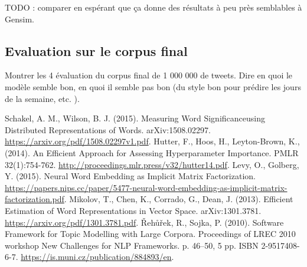 \documentclass[11pt,french,french]{article}
\begin{document}
\colorbox{BurntOrange}{TODO : comparer en espérant que ça 
 donne des résultats à peu près semblables à Gensim.}

\hypertarget{evaluation-sur-le-corpus-final}{%
\subsection{Evaluation sur le corpus
final}\label{evaluation-sur-le-corpus-final}}

\colorbox{BurntOrange}{Montrer les 4 évaluation du corpus final de 1 000 000 de tweets.
 Dire en quoi le modèle semble bon, en quoi il semble pas bon
 (du style bon pour prédire les jours de la semaine, etc. ). }

\nocite{*}

\begin{thebibliography}{999}
 Schakel, A. M., Wilson, B. J. (2015). Measuring Word Significanceusing Distributed Representations of Words. arXiv:1508.02297. \url{https://arxiv.org/pdf/1508.02297v1.pdf}.
 Hutter, F., Hoos, H., Leyton-Brown, K., (2014). An Efficient Approach for Assessing Hyperparameter Importance. PMLR 32(1):754-762. \url{http://proceedings.mlr.press/v32/hutter14.pdf}.
 Levy, O., Golberg, Y. (2015). Neural Word Embedding as Implicit Matrix Factorization.
\url{https://papers.nips.cc/paper/5477-neural-word-embedding-as-implicit-matrix-factorization.pdf}.
 Mikolov, T.,  Chen, K., Corrado, G., Dean, J. (2013). Efficient Estimation of Word Representations in Vector Space. arXiv:1301.3781. \url{https://arxiv.org/pdf/1301.3781.pdf}.
 {\v R}eh{\r u}{\v r}ek, R.,  Sojka, P. (2010). Software Framework for Topic Modelling with Large Corpora. Proceedings of LREC 2010 workshop New Challenges for NLP Frameworks. p. 46--50, 5 pp. ISBN 2-9517408-6-7. \url{https://is.muni.cz/publication/884893/en}.
\end{thebibliography}
\end{document}
